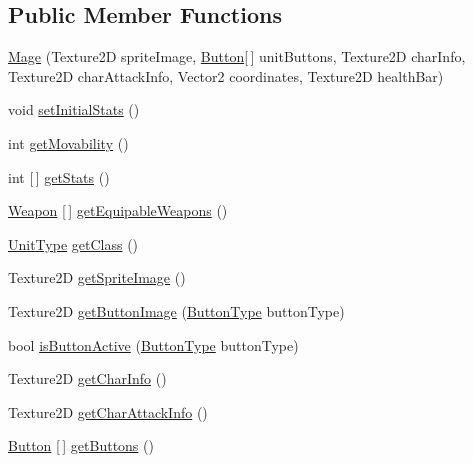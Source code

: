 \subsection*{Public Member Functions}
\begin{DoxyCompactItemize}
\item 
\hyperlink{class_model_1_1_unit_module_1_1_mage_a7ffb443153df0abdc04ceb1da6f1b241}{Mage} (Texture2D sprite\+Image, \hyperlink{class_model_1_1_button}{Button}\mbox{[}$\,$\mbox{]} unit\+Buttons, Texture2D char\+Info, Texture2D char\+Attack\+Info, Vector2 coordinates, Texture2D health\+Bar)
\item 
void \hyperlink{class_model_1_1_unit_module_1_1_mage_a7b16a0324edbd7daa0d54ba5b6bd9735}{set\+Initial\+Stats} ()
\item 
int \hyperlink{class_model_1_1_unit_module_1_1_mage_a85e20ef350f937c14e6de3362c0cdcfb}{get\+Movability} ()
\item 
int \mbox{[}$\,$\mbox{]} \hyperlink{class_model_1_1_unit_module_1_1_mage_aa7cb642ad7aadd1161f1d95e501dfd23}{get\+Stats} ()
\item 
\hyperlink{interface_model_1_1_weapon_module_1_1_weapon}{Weapon} \mbox{[}$\,$\mbox{]} \hyperlink{class_model_1_1_unit_module_1_1_mage_a97144d7360321515956ebb92e8bd0caf}{get\+Equipable\+Weapons} ()
\item 
\hyperlink{namespace_model_1_1_unit_module_aba9769f408747bf38d0d8adca8f68c98}{Unit\+Type} \hyperlink{class_model_1_1_unit_module_1_1_mage_a1fa4709e8927042bfd858a330d8cba22}{get\+Class} ()
\item 
Texture2D \hyperlink{class_model_1_1_unit_module_1_1_mage_a1b771ad25cbaf34997af030b867a5131}{get\+Sprite\+Image} ()
\item 
Texture2D \hyperlink{class_model_1_1_unit_module_1_1_mage_ac15d8706f49bcd67b7492e4e91eff15b}{get\+Button\+Image} (\hyperlink{namespace_model_ac76b3489c9d704f49912608bd36cd0e7}{Button\+Type} button\+Type)
\item 
bool \hyperlink{class_model_1_1_unit_module_1_1_mage_a7a6f09d97b1065dfadd2b7722b80045d}{is\+Button\+Active} (\hyperlink{namespace_model_ac76b3489c9d704f49912608bd36cd0e7}{Button\+Type} button\+Type)
\item 
Texture2D \hyperlink{class_model_1_1_unit_module_1_1_mage_a6c9b2e9f98ed461b77559c1241407c94}{get\+Char\+Info} ()
\item 
Texture2D \hyperlink{class_model_1_1_unit_module_1_1_mage_a69d22e6d54e3f0d7f3cf8b1029755ffe}{get\+Char\+Attack\+Info} ()
\item 
\hyperlink{class_model_1_1_button}{Button} \mbox{[}$\,$\mbox{]} \hyperlink{class_model_1_1_unit_module_1_1_mage_a830affe9a902833c691f89d103b50d31}{get\+Buttons} ()

\end{DoxyCompactItemize}

